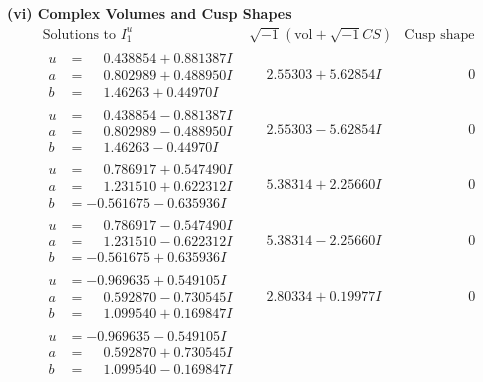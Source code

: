 \documentclass[1p]{elsarticle_modified}
\theoremstyle{definition}
\newcommand{\I}{\sqrt{-1}}
\begin{document}
\newpage\flushleft \textbf{(vi) Complex Volumes and Cusp Shapes}
$$\begin{array}{c|c|c}  
\text{Solutions to }I^u_{1}& \I (\text{vol} + \sqrt{-1}CS) & \text{Cusp shape}\\
 \hline 
\begin{aligned}
u &= \phantom{-}0.438854 + 0.881387 I \\
a &= \phantom{-}0.802989 + 0.488950 I \\
b &= \phantom{-}1.46263 + 0.44970 I\end{aligned}
 & \phantom{-}2.55303 + 5.62854 I & \phantom{-0.000000 } 0 \\ \hline\begin{aligned}
u &= \phantom{-}0.438854 - 0.881387 I \\
a &= \phantom{-}0.802989 - 0.488950 I \\
b &= \phantom{-}1.46263 - 0.44970 I\end{aligned}
 & \phantom{-}2.55303 - 5.62854 I & \phantom{-0.000000 } 0 \\ \hline\begin{aligned}
u &= \phantom{-}0.786917 + 0.547490 I \\
a &= \phantom{-}1.231510 + 0.622312 I \\
b &= -0.561675 - 0.635936 I\end{aligned}
 & \phantom{-}5.38314 + 2.25660 I & \phantom{-0.000000 } 0 \\ \hline\begin{aligned}
u &= \phantom{-}0.786917 - 0.547490 I \\
a &= \phantom{-}1.231510 - 0.622312 I \\
b &= -0.561675 + 0.635936 I\end{aligned}
 & \phantom{-}5.38314 - 2.25660 I & \phantom{-0.000000 } 0 \\ \hline\begin{aligned}
u &= -0.969635 + 0.549105 I \\
a &= \phantom{-}0.592870 - 0.730545 I \\
b &= \phantom{-}1.099540 + 0.169847 I\end{aligned}
 & \phantom{-}2.80334 + 0.19977 I & \phantom{-0.000000 } 0 \\ \hline\begin{aligned}
u &= -0.969635 - 0.549105 I \\
a &= \phantom{-}0.592870 + 0.730545 I \\
b &= \phantom{-}1.099540 - 0.169847 I\end{aligned}

\end{array}$$
\end{document}
